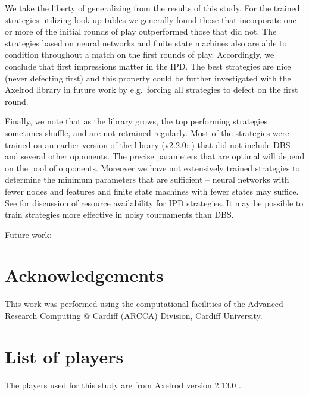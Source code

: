 \documentclass{article}
\begin{document}
We take the liberty of generalizing from the results of this study. For the trained
strategies utilizing look up tables we generally found those that incorporate
one or more of the initial rounds of play outperformed those that did not. The
strategies based on neural networks and finite state machines also are able to
condition throughout a match on the first rounds of play. Accordingly, we conclude
that first impressions matter in the IPD\@. The best strategies are nice (never
defecting first) and this property could be further investigated with the
Axelrod library
in future work by e.g.\ forcing all strategies to defect on the first round.

Finally, we note that as the library grows, the top performing strategies
sometimes shuffle, and are not retrained regularly. Most of the strategies were
trained on an earlier version of the library (v2.2.0: \cite{axelrodproject2.2})
that did not include DBS and several other opponents. The precise parameters
that are optimal will depend on the pool of opponents. Moreover we have not
extensively trained strategies to determine the minimum parameters that are
sufficient -- neural networks with fewer nodes and features and finite state
machines with fewer states may suffice. See \cite{ashlock2013impact} for
discussion of resource availability for IPD strategies. It may be possible to
train strategies more effective in noisy tournaments than DBS.

Future work:


\section*{Acknowledgements}

This work was performed using the computational facilities of the Advanced
Research Computing @ Cardiff (ARCCA) Division, Cardiff University.

\printbibliography

\appendix

\section{List of players}\label{app:list_of_players}

The players used for this study are from Axelrod version 2.13.0
\cite{axelrodproject}.

\begin{multicols}{2}
	\begin{enumerate}
		
	\end{enumerate}
\end{multicols}
\end{document}
